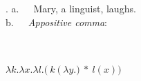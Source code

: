 
\begin{flushleft}
\begin{minipage}{\linewidth}
\begin{multicols}{2}
  \ex. 
  a.~~~Mary, a linguist, laughs.\\
  \vfill\columnbreak
  \hspace{-2cm}b.~~~\textit{Appositive comma}:\\\\
  \hspace*{-1.5cm}~{\small $\lambda k. \lambda x. \lambda l.(~k~(~\lambda y.$$)~*~l (x))$

  }

\end{multicols}
\end{minipage}\\
\end{flushleft}



